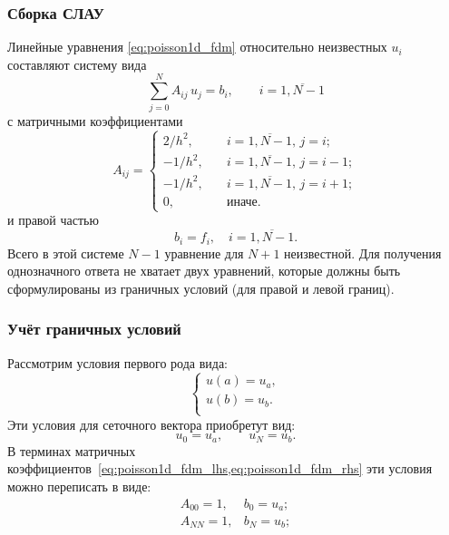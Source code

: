 \subsubsection{Сборка СЛАУ}
Линейные уравнения \cref{eq:poisson1d_fdm} относительно неизвестных $u_i$ составляют систему вида
\begin{equation*}
    \sum_{j=0}^{N} A_{ij}\,u_j = b_i, \qquad i=\overline{1,N-1}
\end{equation*}
с матричными коэффициентами
\begin{equation}
    \label{eq:poisson1d_fdm_lhs}
    A_{ij} = \begin{cases}
        2/h^2,  &\quad i=\overline{1,N-1}, \, j=i;\\
        -1/h^2, &\quad i=\overline{1,N-1}, \, j=i-1;\\
        -1/h^2, &\quad i=\overline{1,N-1}, \, j=i+1;\\
        0,      &\quad \text{иначе}.
    \end{cases}
\end{equation}
и правой частью
\begin{equation}
    \label{eq:poisson1d_fdm_rhs}
    b_i = f_i,   \quad i=\overline{1,N-1}.
\end{equation}
Всего в этой системе $N-1$ уравнение для $N+1$ неизвестной.
Для получения однозначного ответа не хватает двух уравнений, которые
должны быть сформулированы из граничных условий (для правой и левой границ).

\subsubsection{Учёт граничных условий}

Рассмотрим условия первого рода вида:
\begin{equation}
	\label{eq:poisson1d_bc}
	\begin{cases}
        u(a)=u_a,\\[5pt]
        u(b)=u_b.\\
	\end{cases}
\end{equation}
Эти условия для сеточного вектора приобретут вид:
\begin{equation*}
u_0 = u_a, \qquad u_{N} = u_b.
\end{equation*}
В терминах матричных коэффициентов~\cref{eq:poisson1d_fdm_lhs,eq:poisson1d_fdm_rhs}
эти условия можно переписать в виде:
\begin{equation}
\begin{array}{ll}
A_{00} = 1, & b_{0} = u_a; \\
A_{NN} = 1, & b_{N} = u_b; \\
\end{array}
\end{equation}

